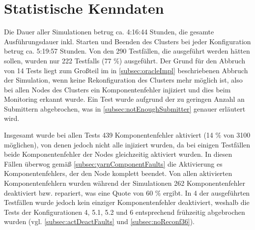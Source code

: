 \section{Statistische Kenndaten}
\label{sec:evaluationStats}

Die Dauer aller Simulationen betrug ca. 4:16:44 Stunden, die gesamte Ausführungsdauer inkl. Starten und Beenden des Clusters bei jeder Konfiguration betrug ca. 5:19:57 Stunden.
Von den 290 Testfällen, die ausgeführt werden hätten sollen, wurden nur 222 \glspl{Testfall} (77 \%) ausgeführt.
Der Grund für den Abbruch von 14 \glspl{Test} liegt zum Großteil im in \cref{subsec:oracleImpl} beschriebenen Abbruch der Simulation, wenn keine Rekonfiguration des Clusters mehr möglich ist, also bei allen Nodes des Clusters ein Komponentenfehler injiziert und dies beim Monitoring erkannt wurde.
Ein \gls{Test} wurde aufgrund der zu geringen Anzahl an Submittern abgebrochen, was in \cref{subsec:notEnoughSubmitter} genauer erläutert wird.

Insgesamt wurde bei allen \glspl{Test} 439 Komponentenfehler aktiviert (14 \% von 3100 möglichen), von denen jedoch nicht alle injiziert wurden, da bei einigen Testfällen beide Komponentenfehler der Nodes gleichzeitig aktiviert wurden.
In diesen Fällen überwog gemäß \cref{subsec:yarnComponentFaults} die Aktivierung es Komponentenfehlers, der den Node komplett beendet.
Von allen aktivierten Komponentenfehlern wurden während der Simulationen 262 Komponentenfehler deaktiviert bzw. repariert, was eine Quote von 60 \% ergibt.
In 4 der ausgeführten Testfällen wurde jedoch kein einziger Komponentenfehler deaktiviert, weshalb die \glspl{Test} der Konfigurationen 4, 5.1, 5.2 und 6 entsprechend frühzeitig abgebrochen wurden (vgl. \cref{subsec:actDeactFaults} und \cref{subsec:noReconf36}).

